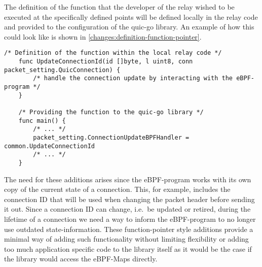 The definition of the function that the developer of the relay wished to be executed at the specifically
defined points will be defined locally in the relay code and provided to the configuration of the quic-go library.
An example of how this could look like is shown in \autoref{changes:definition-function-pointer}.
\vspace{0.2cm}
\begin{lstlisting}[style=GoStyle, label=changes:definition-function-pointer, caption=An example of how the addition looks on the relay side.]
    /* Definition of the function within the local relay code */
    func UpdateConnectionId(id []byte, l uint8, conn packet_setting.QuicConnection) {
        /* handle the connection update by interacting with the eBPF-program */
    }   

    /* Providing the function to the quic-go library */
    func main() {
        /* ... */
        packet_setting.ConnectionUpdateBPFHandler = common.UpdateConnectionId
        /* ... */
    }
\end{lstlisting}

The need for these additions arises since the eBPF-program works with its own copy of the current state of a connection.
This, for example, includes the connection ID that will be used when changing the packet header before sending it out.
Since a connection ID can change, i.e.~be updated or retired, during the lifetime of a connection we need a way to inform 
the eBPF-program to no longer use outdated state-information.
These function-pointer style additions provide a minimal way of adding such functionality without limiting flexibility 
or adding too much application specific code to the library itself as it would be the case if the library would access 
the eBPF-Maps directly.

